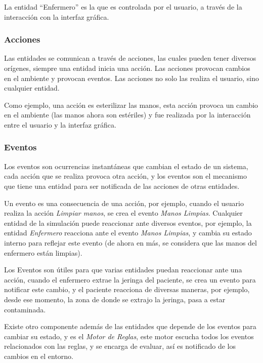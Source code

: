 La entidad \enquote{Enfermero} es la que es controlada por el usuario, a través
de la interacción con la interfaz gráfica.

\subsubsection{Acciones}

Las entidades se comunican a través de acciones, las cuales pueden tener
diversos orígenes, siempre una entidad inicia una acción. Las acciones provocan
cambios en el ambiente y provocan eventos. Las acciones no solo las
realiza el usuario, sino cualquier entidad.

Como ejemplo, una acción es esterilizar las manos, esta acción provoca un
cambio en el ambiente (las manos ahora son estériles) y fue realizada por la
interacción entre el usuario y la interfaz gráfica.

\subsubsection{Eventos}

Los eventos son ocurrencias instantáneas que cambian el estado de un
sistema\cite{banks2000dm}, cada acción que se realiza provoca otra acción, y los
eventos son el mecanismo que tiene una entidad para ser notificada de las
acciones de otras entidades.

Un evento es una consecuencia de una acción, por ejemplo, cuando el usuario 
realiza la acción \emph{Limpiar manos}, se crea el evento \emph{Manos Limpias}. 
Cualquier entidad de la simulación puede reaccionar ante diversos eventos, 
por ejemplo, la entidad \emph{Enfermero} reacciona ante el evento \emph{Manos
Limpias}, y cambia su estado interno para reflejar este evento (de ahora en 
más, se considera que las manos del enfermero están limpias).

Los Eventos son útiles para que varias entidades puedan reaccionar ante
una acción, cuando el enfermero extrae la jeringa del paciente, se crea un
evento para notificar este cambio, y el paciente reacciona de diversas maneras,
por ejemplo, desde ese momento, la zona de donde se extrajo la jeringa, pasa a 
estar contaminada. 

Existe otro componente además de las entidades que depende de los eventos 
para cambiar su estado, y es el \emph{Motor de Reglas}, este motor escucha
todos los eventos relacionados con las reglas, y se encarga de evaluar, así
es notificado de los cambios en el entorno.

